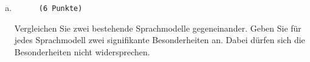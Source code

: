 \documentclass[12pt, ngerman]{AssignmentClass}
\begin{document}
	\begin{solution}
		\noindent
		\\
	\end{solution}

    \begin{answerbox}
		\noindent
		\fbox{\parbox[c]{\textwidth}{
				\vspace{5cm}
				\hspace{\textwidth}
		}}\\
	\end{answerbox}

    \begin{enumerate}[d)]
		\item 
			\begin{minipage}[t]{\linewidth}
				\vspace{-0.61em}
				\begin{figure} 
					\raggedleft
					\texttt{(6 Punkte)}
				\end{figure}
                Vergleichen Sie zwei bestehende Sprachmodelle gegeneinander. Geben Sie für jedes Sprachmodell zwei signifikante Besonderheiten an. Dabei dürfen sich die Besonderheiten nicht widersprechen.                                                                                  
			\end{minipage}
	\end{enumerate}
\end{document}
